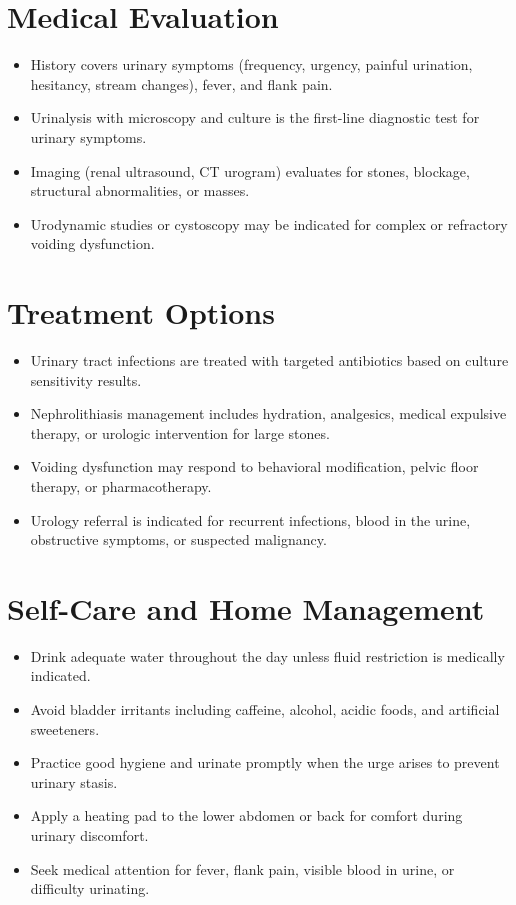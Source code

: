 \section*{Medical Evaluation}
\begin{itemize}
  \item History covers urinary symptoms (frequency, urgency, painful urination, hesitancy, stream changes), fever, and flank pain.
  \item Urinalysis with microscopy and culture is the first-line diagnostic test for urinary symptoms.
  \item Imaging (renal ultrasound, CT urogram) evaluates for stones, blockage, structural abnormalities, or masses.
  \item Urodynamic studies or cystoscopy may be indicated for complex or refractory voiding dysfunction.
\end{itemize}

\section*{Treatment Options}
\begin{itemize}
  \item Urinary tract infections are treated with targeted antibiotics based on culture sensitivity results.
  \item Nephrolithiasis management includes hydration, analgesics, medical expulsive therapy, or urologic intervention for large stones.
  \item Voiding dysfunction may respond to behavioral modification, pelvic floor therapy, or pharmacotherapy.
  \item Urology referral is indicated for recurrent infections, blood in the urine, obstructive symptoms, or suspected malignancy.
\end{itemize}

\section*{Self-Care and Home Management}
\begin{itemize}
  \item Drink adequate water throughout the day unless fluid restriction is medically indicated.
  \item Avoid bladder irritants including caffeine, alcohol, acidic foods, and artificial sweeteners.
  \item Practice good hygiene and urinate promptly when the urge arises to prevent urinary stasis.
  \item Apply a heating pad to the lower abdomen or back for comfort during urinary discomfort.
  \item Seek medical attention for fever, flank pain, visible blood in urine, or difficulty urinating.
\end{itemize}

